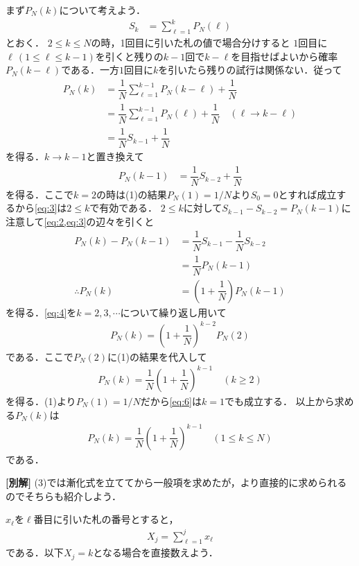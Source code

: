 \documentclass[../../main.tex]{subfiles}
\begin{document}
まず$P_{N}(k)$について考えよう．
\begin{align}
  S_{k} &= \sum_{\ell=1}^{k}P_{N}(\ell) \label{eq:1}
\end{align}
とおく．
$2 \le k \le N$の時，1回目に引いた札の値で場合分けすると $1$回目に$\ell\, (1 \le \ell \le k-1)$を引くと残りの$k-1$回で$k-\ell$を目指せばよいから確率$P_{N}(k-\ell)$である．一方$1$回目に$k$を引いたら残りの試行は関係ない．従って
\begin{align}
  P_{N}(k)
  &= \dfrac{1}{N}\sum_{\ell=1}^{k-1}P_{N}(k-\ell)+\dfrac{1}{N} \\
  &= \dfrac{1}{N}\sum_{\ell=1}^{k-1}P_{N}(\ell)+\dfrac{1}{N} \quad (\ell \to k-\ell)\\
  &= \dfrac{1}{N}S_{k-1}+\dfrac{1}{N} \label{eq:2}
\end{align}
を得る．$k\to k-1$と置き換えて
\begin{align}
  P_{N}(k-1) &= \dfrac{1}{N}S_{k-2}+\dfrac{1}{N} \label{eq:3}
\end{align}
を得る．ここで$k=2$の時は(1)の結果$P_{N}(1)=1/N$より$S_{0}=0$とすれば成立するから\cref{eq:3}は$2 \le k$で有効である．
$2 \le k$に対して$S_{k-1} - S_{k-2}=P_{N}(k-1)$に注意して\cref{eq:2,eq:3}の辺々を引くと
\begin{align}
  P_{N}(k) - P_{N}(k-1)
  &= \dfrac{1}{N}S_{k-1} - \dfrac{1}{N}S_{k-2} \\
  &= \dfrac{1}{N}P_{N}(k-1) \\
  \therefore
  P_{N}(k) &= \left(1+\dfrac{1}{N}\right)P_{N}(k-1) \label{eq:4}
\end{align}
を得る．\cref{eq:4}を$k=2,3,\cdots$について繰り返し用いて
\begin{align}
  P_N(k)=\left(1+\dfrac{1}{N}\right)^{k-2}P_N(2) \label{eq:5}
\end{align}
である．ここで$P_N(2)$に(1)の結果を代入して
\begin{align}
  P_N(k)=\dfrac{1}{N}\left(1+\dfrac{1}{N}\right)^{k-1} \quad(k\ge2)  \label{eq:6}
\end{align}
を得る．(1)より$P_N(1)=1/N$だから\cref{eq:6}は$k=1$でも成立する．
以上から求める$P_N(k)$は
\begin{align}
  P_N(k)=\dfrac{1}{N}\left(1+\dfrac{1}{N}\right)^{k-1} \quad (1 \le k \le N)
\end{align}
である．

{\bf [別解]}
(3)では漸化式を立ててから一般項を求めたが，より直接的に求められるのでそちらも紹介しよう．

$x_{\ell}$を$\ell$番目に引いた札の番号とすると，
\begin{align}
  X_j= \sum_{\ell=1}^jx_{\ell}
\end{align}
である．以下$X_j=k$となる場合を直接数えよう．
\end{document}
